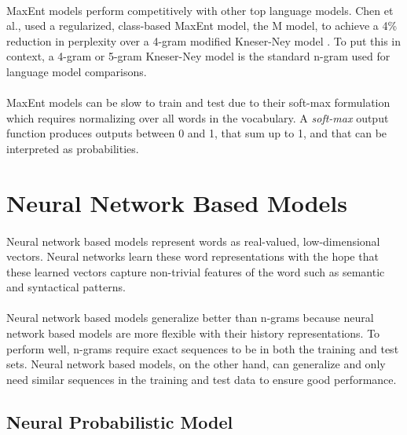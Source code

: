 \paragraph{}
MaxEnt models perform competitively with other top language models. Chen et al., used a regularized, class-based MaxEnt model, the M model, to achieve a 4\% reduction in perplexity over a 4-gram modified Kneser-Ney model \cite{Chen2009}. To put this in context, a 4-gram or 5-gram Kneser-Ney model is the standard n-gram used for language model comparisons.
\paragraph{}

MaxEnt models can be slow to train and test due to their soft-max formulation which requires normalizing over all words in the vocabulary. A \emph{soft-max} output function produces outputs between 0 and 1, that sum up to 1, and that can be interpreted as probabilities. 

\section{Neural Network Based Models} \label{sec:nplm}
\paragraph{}
Neural network based models represent words as real-valued, low-dimensional vectors. Neural networks learn these word representations with the hope that these learned vectors capture non-trivial features of the word such as semantic and syntactical patterns.
\paragraph{}
Neural network based models generalize better than n-grams because neural network based models are more flexible with their history representations. To perform well, n-grams require exact sequences to be in both the training and test sets. Neural network based models, on the other hand, can generalize and only need similar sequences in the training and test data to ensure good performance.

\subsection{Neural Probabilistic Model}
